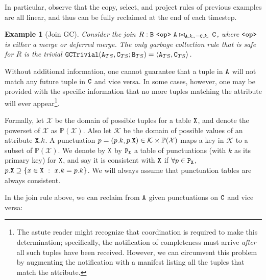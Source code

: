 \documentclass{article}
\numberwithin{equation}{section}
\newtheorem{example}{Example}[section]
\renewcommand{\tt}[1]{\ifmmode\text{\texttt{#1}}\else\texttt{#1}\fi}
\begin{document}
In particular, observe that the copy, select, and project rules of previous examples are all linear, and thus can be fully reclaimed at the end of each timestep.

\begin{example}[Join GC]
\label{ex:join_gc_no_punctuations}
Consider the join $R: \tt{B} ~\tt{<op>}~ \tt{A} \bowtie_{\tt{A}.k_a = \tt{C}.k_c} \tt{C}$, where $\tt{<op>}$ is either a merge or deferred merge.
The only garbage collection rule that is safe for $R$ is the trivial $\tt{GCTrivial}(\tt{A}_{TS}, \tt{C}_{TS}; \tt{B}_{TS}) = \langle \tt{A}_{TS}, \tt{C}_{TS} \rangle$.
\end{example}
Without additional information, one cannot guarantee that a tuple in $\tt{A}$ will not match any future tuple in $\tt{C}$ and vice versa.
In some cases, however, one may be provided with the specific information that no more tuples matching the attribute will ever appear\footnote{
	The astute reader might recognize that coordination is required to make this determination; specifically, the notification of completeness must arrive \emph{after} all such tuples have been received.
    However, we can circumvent this problem by augmenting the notification with a manifest listing all the tuples that match the attribute.
}.

Formally, let $\mathcal{X}$ be the domain of possible tuples for a table $\tt{X}$, and denote the powerset of $\mathcal{X}$ as $\mathbb{P}(\mathcal{X})$.
Also let $\mathcal{K}$ be the domain of possible values of an attribute $\tt{X}.k$.
A punctuation $p = (p.k, p.\tt{X}) \in \mathcal{K} \times \mathbb{P}(\mathcal{X})$ maps a key in $\mathcal{K}$ to a subset of $\mathbb{P}(\mathcal{X})$.
We denote by $\tt{X}$ by $\tt{P}_\tt{X}$ a table of punctuations (with $k$ as its primary key) for $\tt{X}$, and say it is consistent with $\tt{X}$ if $\forall p \in \tt{P}_\tt{X}$, $p.\tt{X} \supseteq \{x \in \tt{X} ~:~ x.k = p.k\}$.
We will always assume that punctuation tables are always consistent.

In the join rule above, we can reclaim from $\tt{A}$ given punctuations on $\tt{C}$ and vice versa:
\end{document}
